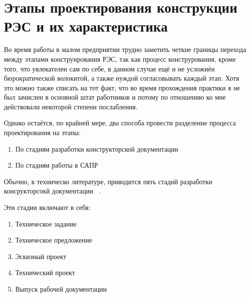 \section{Этапы проектирования конструкции РЭС и их характеристика}

Во время работы в малом предприятии трудно заметить
четкие границы перехода между этапами конструирования РЭС,
так как процесс конструрования, кроме того, что увлекателен сам по себе,
в данном случае ещё и не усложнён бюрократической волокитой,
а также нуждой согласовывать каждый этап.
Хотя это можно также списать на тот факт,
что во время прохождения практики я не был зачислен в основной штат работников и
потому по отношению ко мне действовали некоторой степени послабления.


Однако остаётся, по крайней мере, два способа
провести разделение процесса проектирования
на этапы:

\begin{enumerate}
\item По стадиям разработки конструкторской документации
\item По стадиям работы в САПР
\end{enumerate}

Обычно, в техническо литературе, приводится пять стадий разработки консрукторсокй документации ~\cite{Rotkop1976}.

Эти стадии включают в себя:

\begin{enumerate}
\item Техническое задание         
\item Техническое предложение     
\item Эскизный проект             
\item Технический проект          
\item Выпуск рабочей документации   
\end{enumerate}

\newpage
